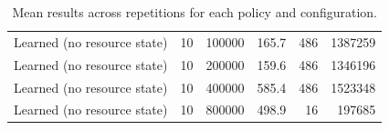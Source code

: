 \begin{table}[h]
\begin{tabular}{@{}lrrrrr@{}}
Learned (no resource state) & 10 & 100000 & 165.7 & 486 & 1387259 \\
Learned (no resource state) & 10 & 200000 & 159.6 & 486 & 1346196 \\
Learned (no resource state) & 10 & 400000 & 585.4 & 486 & 1523348 \\
Learned (no resource state) & 10 & 800000 & 498.9 & 16 & 197685 \\
\bottomrule
\end{tabular}
\caption{Mean results across repetitions for each policy and configuration.}
\label{tab:results}
\end{table}
